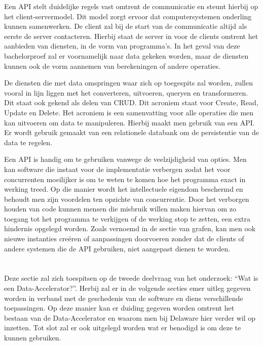 Een API stelt duidelijke regels vast omtrent de communicatie en steunt hierbij op het client-servermodel. Dit model zorgt ervoor dat computersystemen onderling kunnen samenwerken. De client zal bij de start van de communicatie altijd als eerste de server contacteren. Hierbij staat de server in voor de clients omtrent het aanbieden van diensten, in de vorm van programma's. In het geval van deze bachelorproef zal er voornamelijk naar data gekeken worden, maar de diensten kunnen ook de vorm aannemen van berekeningen of andere operaties.

De diensten die met data omspringen waar zich op toegespits zal worden, zullen vooral in lijn liggen met het converteren, uitvoeren, queryen en transformeren. Dit staat ook gekend als delen van CRUD. Dit acroniem staat voor Create, Read, Update en Delete.\autocite{Martin1983} Het acroniem is een samenvatting voor alle operaties die men kan uitvoeren om data te manipuleren. Hierbij maakt men gebruik van een API. Er wordt gebruik gemaakt van een relationele databank om de persistentie van de data te regelen.

Een API is handig om te gebruiken vanwege de veelzijdigheid van opties. Men kan software die instaat voor de implementatie verbergen zodat het voor concurrenten moeilijker is om te weten te komen hoe het programma exact in werking treed. Op die manier wordt het intellectuele eigendom beschermd en behoudt men zijn voordelen ten opzichte van concurrentie. Door het verborgen houden van code kunnen mensen die misbruik willen maken hiervan om zo toegang tot het programma te verkijgen of de werking stop te zetten, een extra hindernis opgelegd worden. Zoals vernoemd in de sectie van grafen, kan men ook nieuwe instanties creëren of aanpassingen doorvoeren zonder dat de clients of andere systemen die de API gebruiken, niet aangepast dienen te worden.\autocite{Martin2017}

\section{}%
\label{sec:Data-Accelerator}

Deze sectie zal zich toespitsen op de tweede deelvraag van het onderzoek: “Wat is een Data-Accelerator?”. Herbij zal er in de volgende secties emer uitleg gegeven worden in verband met de geschedenis van de software en diens verschillende toepassingen. Op deze manier kan er duiding gegeven worden omtrent het bestaan van de Data-Accelerator en waarom men bij Delaware hier verder wil op inzetten. Tot slot zal er ook uitgelegd worden wat er benodigd is om deze te kunnen gebruiken.

